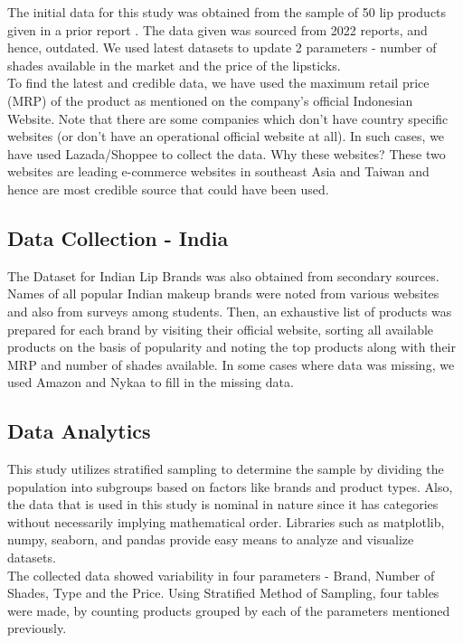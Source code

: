 \documentclass{article}
\begin{document}
\noindent The initial data for this study was obtained from the sample of 50 lip products given in a prior report \cite{casestudy}. The data given was sourced from 2022 reports, and hence, outdated. We used latest datasets to update 2 parameters - number of shades available in the market and the price of the lipsticks. \\

\noindent To find the latest and credible data, we have used the maximum retail price (MRP) of the product as mentioned on the company's official Indonesian Website. Note that there are some companies which don't have country specific websites (or don't have an operational official website at all). In such cases, we have used Lazada/Shoppee to collect the data. Why these websites? These two websites are leading e-commerce websites in southeast Asia and Taiwan and hence are most credible source that could have been used.

\subsection{Data Collection - India}
The Dataset for Indian Lip Brands was also obtained from secondary sources. Names of all popular Indian makeup brands were noted from various websites \cite{paletteTataCliq} \cite{timesprimeLipsticks2023} \cite{timesprimeMakeupBrands} and also from surveys among students. Then, an exhaustive list of products was prepared for each brand by visiting their official website, sorting all available products on the basis of popularity and noting the top products along with their MRP and number of shades available.
\noindent In some cases where data was missing, we used Amazon and Nykaa to fill in the missing data.


\subsection{Data Analytics}
This study utilizes stratified sampling to determine the sample by dividing the population into subgroups based on factors like brands and product types. Also, the data that is used in this study is nominal in nature since it has categories without necessarily implying mathematical order. Libraries such as matplotlib, numpy, seaborn, and pandas provide easy means to analyze and visualize datasets. \\

\noindent The collected data showed variability in four parameters - Brand, Number of Shades, Type and the Price. Using Stratified Method of Sampling, four tables were made, by counting products grouped by each of the parameters mentioned previously.
\end{document}
